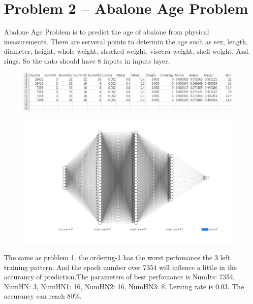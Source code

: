 \documentclass[runningheads]{llncs}
\begin{document}
\section{Problem 2 – Abalone Age Problem }
Abalone Age Problem is to predict the age of abalone from physical measurements.
There are serveral points to determin the age such as sex, length, diameter,
height, whole weight, shucked weight, viscera weight, shell weight, And
rings. So the data should have 8 inputs in inputs layer.
\begin{figure}[H]
    \centering
    \includegraphics[scale=0.7]{data2.PNG}  
\end{figure}
\begin{figure}[H]
    \centering
    \includegraphics[scale=0.7]{MLP.PNG}  
\end{figure}

The same as problem 1, the ordering-1 has the worst perfomance the 
3 left training pattern. And the epoch number over 7354 will inflence
a little in the accurancy of prediction.The parameters of best perfomance
is NumIts: 7354, NumHN: 3, NumHN1: 16, NumHN2: 16, NumHN3: 8. Lerning
rate is 0.03. The accurancy can reach 80\%.
\end{document}
